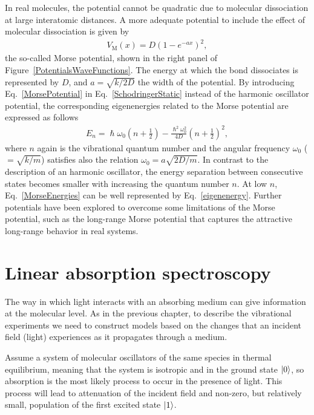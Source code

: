 In real molecules, the potential cannot be quadratic due to molecular dissociation at large interatomic distances.\!\cite{Maksyutenko2012} A more adequate potential to include the effect of molecular dissociation is given by
\begin{eqnarray}
V_\text{M} (x) = D \left( 1 - e^{-a x}   \right)^2,
\label{MorsePotential}
\end{eqnarray}
the so-called Morse potential,\!\cite{Morse1929} shown in the right panel of Figure~\ref{PotentialsWaveFunctions}. The energy at which the bond dissociates is represented by $D$, and $a = \sqrt{k/2D}$ the width of the potential. By introducing Eq.\ \ref{MorsePotential} in Eq.\ \ref{SchodringerStatic} instead of the harmonic oscillator potential, the corresponding eigenenergies related to the Morse potential are expressed as follows
\begin{eqnarray}
E_n = \hslash \omega_0 \left( n + \frac{1}{2}   \right) - \frac{\hslash^2 \omega_0^2}{4 D} \left( n + \frac{1}{2}   \right)^2,
\label{MorseEnergies}
\end{eqnarray}
where $n$ again is the vibrational quantum number and the angular frequency $\omega_0$ ($= \sqrt{k/m}$) satisfies also the relation $ \omega_0 = a \sqrt{2 D/ m}$. In contrast to the description of an harmonic oscillator, the energy separation between consecutive states becomes smaller with increasing the quantum number $n$. At low $n$, Eq.\ \ref{MorseEnergies} can be well represented by Eq.\ \ref{eigenenergy}. Further potentials have been explored to overcome some limitations of the Morse potential, such as the long-range Morse potential that captures the attractive long-range behavior in real systems.\!\cite{LeRoy2009}





\section{Linear absorption spectroscopy}


The way in which light interacts with an absorbing medium can give information at the molecular level. As in the previous chapter, to describe the vibrational experiments we need to construct models based on the changes that an incident field (light) experiences as it propagates through a medium. 

Assume a system of molecular oscillators of the same species in thermal equilibrium, meaning that the system is isotropic and in the ground state $\ket{0}$, so absorption is the most likely process to occur in the presence of light. This process will lead to attenuation of the incident field and non-zero, but relatively small, population of the first excited state $\ket{1}$.

